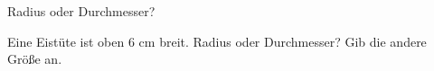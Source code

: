 \setcounter{aufgabe}{17}

\begin{aufgabe}{Radius oder Durchmesser?}
\begin{teile}
\teil Eine Eistüte ist oben $6$ cm breit. Radius oder Durchmesser? Gib die andere Größe an. \leerfeld
\end{teile}
\end{aufgabe}

